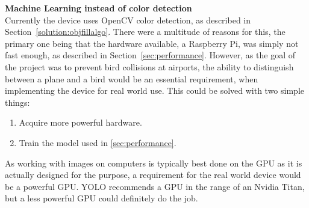\textbf{Machine Learning instead of color detection}\\
Currently the device uses OpenCV color detection, as described in Section~\ref{solution:objfillalgo}.
There were a multitude of reasons for this, the primary one being that the hardware available, a Raspberry Pi, was simply not fast enough, as described in Section~\ref{sec:performance}.
However, as the goal of the project was to prevent bird collisions at airports, the ability to distinguish between a plane and a bird would be an essential requirement, when implementing the device for real world use.
This could be solved with two simple things:
\begin{enumerate}
    \item Acquire more powerful hardware.
    \item Train the model used in \ref{sec:performance}.
\end{enumerate}
As working with images on computers is typically best done on the GPU as it is actually designed for the purpose, a requirement for the real world device would be a powerful GPU.
YOLO recommends a GPU in the range of an Nvidia Titan, but a less powerful GPU could definitely do the job.
